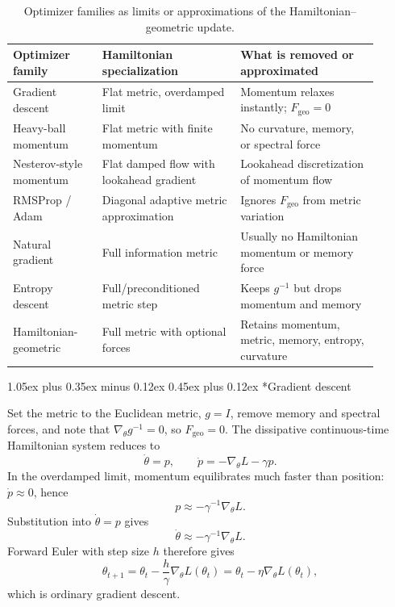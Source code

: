 \documentclass[10pt,twocolumn]{article}
\makeatletter
\renewcommand\subsection{\@startsection{subsection}{2}{0pt}%
  {1.05ex plus 0.35ex minus 0.12ex}%
  {0.45ex plus 0.12ex}%
  {\normalsize\bfseries}}
\makeatother
\begin{document}
\begin{table}[t]
\centering
\caption{Optimizer families as limits or approximations of the
Hamiltonian--geometric update.}
\label{tab:special-cases}
\begin{tabular}{@{}p{0.22\linewidth}p{0.34\linewidth}p{0.34\linewidth}@{}}
\toprule
Optimizer family & Hamiltonian specialization & What is removed or approximated \\
\midrule
Gradient descent & Flat metric, overdamped limit & Momentum relaxes instantly; $F_{\mathrm{geo}}=0$ \\
Heavy-ball momentum & Flat metric with finite momentum & No curvature, memory, or spectral force \\
Nesterov-style momentum & Flat damped flow with lookahead gradient & Lookahead discretization of momentum flow \\
RMSProp / Adam & Diagonal adaptive metric approximation & Ignores $F_{\mathrm{geo}}$ from metric variation \\
Natural gradient & Full information metric & Usually no Hamiltonian momentum or memory force \\
Entropy descent & Full/preconditioned metric step & Keeps $g^{-1}$ but drops momentum and memory \\
Hamiltonian-geometric & Full metric with optional forces & Retains momentum, metric, memory, entropy, curvature \\
\bottomrule
\end{tabular}
\end{table}

\subsection*{Gradient descent}

Set the metric to the Euclidean metric, $g=I$, remove memory and spectral
forces, and note that $\nabla_\theta g^{-1}=0$, so $F_{\mathrm{geo}}=0$. The
dissipative continuous-time Hamiltonian system reduces to
\begin{equation}
\dot\theta = p,\qquad \dot p = -\nabla_\theta L-\gamma p.
\end{equation}
In the overdamped limit, momentum equilibrates much faster than position:
$\dot p\approx0$, hence
\begin{equation}
p\approx-\gamma^{-1}\nabla_\theta L.
\end{equation}
Substitution into $\dot\theta=p$ gives
\begin{equation}
\dot\theta\approx-\gamma^{-1}\nabla_\theta L.
\end{equation}
Forward Euler with step size $h$ therefore gives
\begin{equation}
\theta_{t+1}=\theta_t-\frac{h}{\gamma}\nabla_\theta L(\theta_t)
           =\theta_t-\eta\nabla_\theta L(\theta_t),
\end{equation}
which is ordinary gradient descent.
\end{document}
